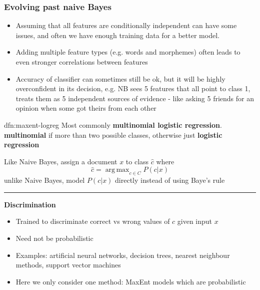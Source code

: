 \documentclass[landscape, 8pt]{extarticle}
\DeclareMathOperator*{\argmax}{arg\,max}
\begin{document}
\begin{multicols}{3}
\subsubsection{Evolving past naive Bayes}
\begin{itemize}
    \setlength\itemsep{0em}
    \item Assuming that all features are conditionally independent can have some issues, and often we have enough training data for a better model.
    \item Adding multiple feature types (e.g. words and morphemes) often leads to even stronger correlations between features
    \item Accuracy of classifier can sometimes still be ok, but it will be highly overconfident in its decision, e.g. NB sees 5 features that all point to class 1, treats them as 5 independent sources of evidence - like asking 5 friends for an opinion when some got theirs from each other
\end{itemize}

\begin{dfn}{dfn:maxent-logreg}{}
    \vspace{-5pt}
    Most commonly \textbf{multinomial logistic regression}. \textbf{multinomial} if more than two possible classes, otherwise just \textbf{logistic regression}

    Like Naive Bayes, assign a document $x$ to class $\hat{c}$ where
    \[\hat{c} = \argmax_{c\in C} P(c |x)\]
    unlike Naive Bayes, model $P(c|x)$ directly instead of using Baye's rule

    \vspace{-5pt}
    \noindent\rule{\textwidth}{0.2pt}

    \textbf{Discrimination}

    \vspace{-5pt}
    \begin{itemize}
        \setlength\itemsep{0em}
        \item Trained to discriminate correct vs wrong values of $c$ given input $x$
        \item Need not be probabilistic
        \item Examples: artificial neural networks, decision trees, nearest neighbour methods, support vector machines
        \item Here we only consider one method: MaxEnt models which are probabilistic
    \end{itemize}


\end{dfn}
\end{multicols}
\end{document}
